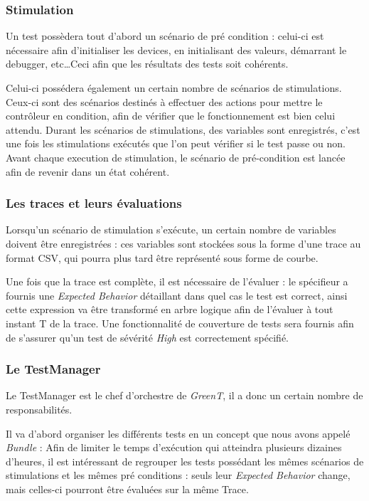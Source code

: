	\subsubsection{Stimulation} \label{stim}
		Un test possèdera tout d'abord un scénario de pré condition : celui-ci est nécessaire afin d'initialiser les devices, en initialisant des valeurs, démarrant le debugger, etc\ldots Ceci afin que les résultats des tests soit cohérents.

		Celui-ci possédera également un certain nombre de scénarios de stimulations. Ceux-ci sont des scénarios destinés à effectuer des actions pour mettre le contrôleur en condition, afin de vérifier que le fonctionnement est bien celui attendu. Durant les scénarios de stimulations, des variables sont enregistrés, c'est une fois les stimulations exécutés que l'on peut vérifier si le test passe ou non. Avant chaque execution de stimulation, le scénario de pré-condition est lancée afin de revenir dans un état cohérent.

	\subsubsection{Les traces et leurs évaluations}\label{expectedBehavior}
	Lorsqu'un scénario de stimulation s'exécute, un certain nombre de variables doivent être enregistrées : ces variables sont stockées sous la forme d'une trace au format CSV, qui pourra plus tard être représenté sous forme de courbe. 

	Une fois que la trace est complète, il est nécessaire de l'évaluer : le spécifieur a fournis une \textit{Expected Behavior} détaillant dans quel cas le test est correct, ainsi cette expression va être transformé en arbre logique afin de l'évaluer à tout instant T de la trace. Une fonctionnalité de couverture de tests sera fournis afin de s'assurer qu'un test de sévérité \textit{High} est correctement spécifié.

	\subsubsection{Le TestManager}\label{testManager}
	Le TestManager est le chef d'orchestre de \textit{GreenT}, il a donc un certain nombre de responsabilités. 

	Il va d'abord organiser les différents tests en un concept que nous avons appelé \textit{Bundle} : Afin de limiter le temps d'exécution qui atteindra plusieurs dizaines d'heures, il est intéressant de regrouper les tests possédant les mêmes scénarios de stimulations et les mêmes pré conditions : seuls leur \textit{Expected Behavior} change, mais celles-ci pourront être évaluées sur la même Trace.

